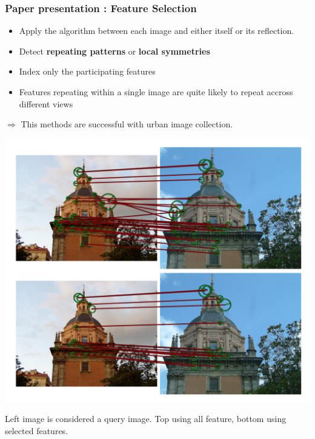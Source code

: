 \documentclass[11pt]{beamer}
\begin{document}
\begin{frame}
\frametitle{Paper presentation : Feature Selection}
\begin{itemize}
\item Apply the algorithm between each image and either itself or its reflection.
\item Detect \textbf{repeating patterns} or \textbf{local symmetries}
\item Index only the participating features
\item Features repeating within a single image are quite likely to repeat accross different views
\end{itemize}

$\Rightarrow$ This methods are successful with urban image collection.
\end{frame}

\begin{frame}
\begin{center}
\includegraphics[scale=0.3]{figure1.png}
\end{center}
Left image is considered a query image. Top using all feature, bottom using selected features.
\end{frame}
\end{document}
